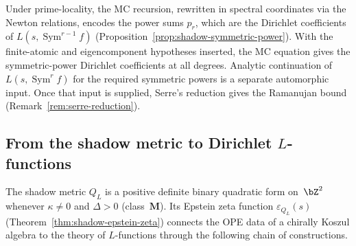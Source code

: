 \begin{remark}%
\label{rem:mc-ramanujan-bridge}%
\ClaimStatusProvedHere%
%
Under prime-locality, the MC recursion, rewritten in spectral
coordinates via the Newton relations, encodes the power sums $p_r$,
which are the Dirichlet coefficients of
$L(s,\operatorname{Sym}^{r-1}f)$
(Proposition~\ref{prop:shadow-symmetric-power}).
With the finite-atomic and eigencomponent hypotheses inserted, the
MC equation gives the symmetric-power Dirichlet coefficients at all
degrees. Analytic continuation of
$L(s,\operatorname{Sym}^r f)$ for the required symmetric powers is a
separate automorphic input. Once that input is supplied, Serre's
reduction gives the Ramanujan bound
(Remark~\ref{rem:serre-reduction}).
\end{remark}

\subsection{From the shadow metric to Dirichlet $L$-functions}
\label{subsec:shadow-metric-l-functions}

The shadow metric $Q_L$ is a positive definite binary quadratic
form on~$\bZ^2$ whenever $\kappa \neq 0$ and $\Delta > 0$
\textup{(}class~$\mathbf{M}$\textup{)}. Its Epstein zeta function
$\varepsilon_{Q_L}(s)$
\textup{(}Theorem~\textup{\ref{thm:shadow-epstein-zeta}}\textup{)}
connects the OPE data of a chirally Koszul algebra to the theory
of $L$-functions through the following chain of constructions.

